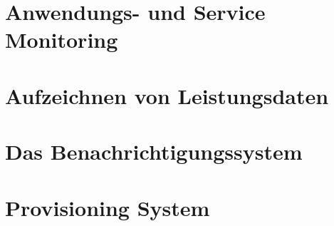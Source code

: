\chapter{Anwendungs- und Service Monitoring}




\chapter{Aufzeichnen von Leistungsdaten}











\chapter{Das Benachrichtigungssystem}








\chapter{Provisioning System}





